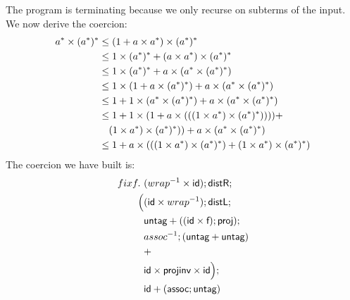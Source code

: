 \documentclass[a4paper,UKenglish,cleveref, autoref, thm-restate]{lipics-v2021}
\begin{document}
The program is terminating because we only recurse on subterms of the input. We now derive the coercion:
\begin{align}
a^* \times ({a^*})^* &\leq (1 + a \times a^*) \times ({a^*})^*   \\
                     &\leq 1 \times ({a^*})^* + (a \times a^* ) \times ({a^*})^*\\
                     &\leq 1 \times ({a^*})^* +  a \times (a^*  \times ({a^*})^*) \\
                     &\leq 1 \times (1 + a \times ({a^*})^*) +  a \times (a^*  \times ({a^*})^*) \\
                     &\leq 1 + 1 \times (a^* \times ({a^*})^*) +  a \times (a^*  \times ({a^*})^*)\\
                     &\leq 1 + 1\times ( 1 + a \times (((1 \times a^*) \times ({a^*})^*)))) +\\
                     &\quad(1 \times a^*) \times ({a^*})^*))  + a \times (a^*  \times ({a^*})^*) \\
                     &\leq 1 + a \times (((1 \times a^*) \times ({a^*})^*) + (1 \times a^*) \times ({a^*})^*)
\end{align}
The coercion we have built is:
\begin{align}
\fix f.~&(\dslcominv{wrap} \times \dslcom{id});\dslcom{distR};\\
 \Big( &(\dslcom{id} \times \dslcominv{wrap});\dslcom{distL};\\
       &\dslcom{untag} + ((\dslcom{id} \times \dslcom{f});\dslcom{proj});\\
       &\dslcominv{assoc};(\dslcom{untag} + \dslcom{untag}) \\
&+\\
 &\dslcom{id} \times \dslcom{projinv} \times \dslcom{id} \Big);\\
 &\dslcom{id} + (\dslcom{assoc} ; \dslcom{untag})
\end{align}
\end{document}
